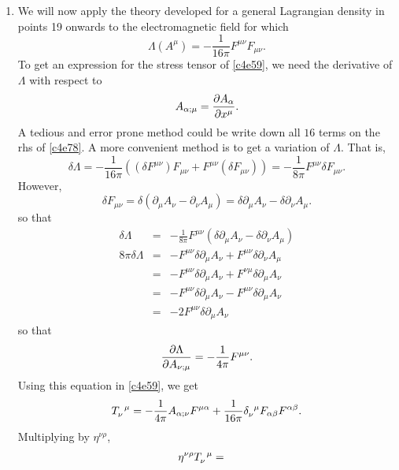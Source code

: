 \begin{enumerate}
\item We will now apply the theory developed for a general Lagrangian density
in points 19 onwards to the electromagnetic field for which
\begin{equation}\label{c4e76}
\Lambda(A^\mu) = -\frac{1}{16\pi}F^{\mu\nu}F_{\mu\nu}.
\end{equation}
To get an expression for the stress tensor of \eqref{c4e59}, we need the 
derivative of $\Lambda$ with respect to 
\[
A_{\alpha; \mu} = \frac{\partial{A_\alpha}}{\partial{x^\mu}}.
\]
A tedious and error prone method could be write down all $16$ terms on the rhs 
of \eqref{c4e78}. A more convenient method is to get a variation of $\Lambda$. 
That is,
\begin{equation}\label{c4e77}
\delta\Lambda = -\frac{1}{16\pi}\left((\delta F^{\mu\nu})F_{\mu\nu} + 
F^{\mu\nu}(\delta F_{\mu\nu})\right) = 
-\frac{1}{8\pi}F^{\mu\nu}\delta F_{\mu\nu}.
\end{equation}
However,
\begin{equation}\label{c4e78}
\delta F_{\mu\nu} = \delta(\partial_\mu A_\nu - \partial_\nu A_\mu)
= \delta\partial_\mu A_\nu - \delta\partial_\nu A_\mu.
\end{equation}
so that
\begin{eqnarray}
\delta\Lambda &=& -\frac{1}{8\pi}F^{\mu\nu}(\delta\partial_\mu A_\nu - 
	\delta\partial_\nu A_\mu) \nonumber \\
8\pi\delta\Lambda &=& -F^{\mu\nu}\delta\partial_\mu A_\nu + 
	F^{\mu\nu}\delta\partial_\nu A_\mu \nonumber \\
 &=& -F^{\mu\nu}\delta\partial_\mu A_\nu + F^{\nu\mu}\delta\partial_\mu 
 	A_\nu \nonumber \\
 &=& -F^{\mu\nu}\delta\partial_\mu A_\nu - F^{\mu\nu}\delta\partial_\mu A_\nu 
 \nonumber \\
 &=& -2F^{\mu\nu}\delta\partial_\mu A_\nu \label{c4e79}
\end{eqnarray}
so that
\begin{equation}\label{c4e80}
\frac{\partial{\Lambda}}{\partial{A_{\nu;\mu}}} = -\frac{1}{4\pi}F^{\mu\nu}.
\end{equation}
Using this equation in \eqref{c4e59}, we get
\begin{equation}\label{c4e81}
\tensor{T}{_\nu^\mu} = -\frac{1}{4\pi}A_{\alpha;\nu}F^{\mu\alpha} +
\frac{1}{16\pi}\tensor{\delta}{_\nu^\mu} F_{\alpha\beta}F^{\alpha\beta}.
\end{equation}
Multiplying by $\eta^{\nu\rho}$,
\begin{eqnarray}
\eta^{\nu\rho}\tensor{T}{_\nu^\mu} &=& 

\end{eqnarray}
\end{enumerate}
